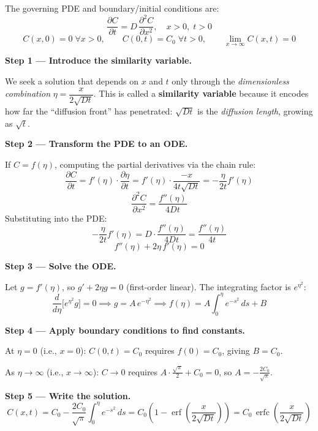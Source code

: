 \documentclass[11pt]{article}
\begin{document}
\begin{methodbox}
The governing PDE and boundary/initial conditions are:
\[
\frac{\partial C}{\partial t} = D\,\frac{\partial^2 C}{\partial x^2}, \quad x > 0, \; t > 0
\]
\[
C(x, 0) = 0 \; \forall x > 0, \qquad C(0, t) = C_0 \; \forall t > 0, \qquad \lim_{x \to \infty} C(x,t) = 0
\]

\textbf{Step 1 --- Introduce the similarity variable.}

We seek a solution that depends on $x$ and $t$ only through the \textit{dimensionless combination} $\eta = \dfrac{x}{2\sqrt{Dt}}$. This is called a \textbf{similarity variable} because it encodes how far the ``diffusion front'' has penetrated: $\sqrt{Dt}$ is the \textit{diffusion length}, growing as $\sqrt{t}$.

\textbf{Step 2 --- Transform the PDE to an ODE.}

If $C = f(\eta)$, computing the partial derivatives via the chain rule:
\[
\frac{\partial C}{\partial t} = f'(\eta)\cdot\frac{\partial\eta}{\partial t} = f'(\eta)\cdot\frac{-x}{4t\sqrt{Dt}} = -\frac{\eta}{2t}f'(\eta)
\]
\[
\frac{\partial^2 C}{\partial x^2} = \frac{f''(\eta)}{4Dt}
\]
Substituting into the PDE:
\[
-\frac{\eta}{2t}f'(\eta) = D\cdot\frac{f''(\eta)}{4Dt} = \frac{f''(\eta)}{4t}
\]
\[
f''(\eta) + 2\eta\,f'(\eta) = 0
\]

\textbf{Step 3 --- Solve the ODE.}

Let $g = f'(\eta)$, so $g' + 2\eta g = 0$ (first-order linear). The integrating factor is $e^{\eta^2}$:
\[
\frac{d}{d\eta}\bigl[e^{\eta^2}g\bigr] = 0 \implies g = A\,e^{-\eta^2} \implies f(\eta) = A\int_0^{\eta} e^{-s^2}\,ds + B
\]

\textbf{Step 4 --- Apply boundary conditions to find constants.}

At $\eta = 0$ (i.e., $x = 0$): $C(0,t) = C_0$ requires $f(0) = C_0$, giving $B = C_0$.

As $\eta \to \infty$ (i.e., $x \to \infty$): $C \to 0$ requires $A\cdot\frac{\sqrt{\pi}}{2} + C_0 = 0$, so $A = -\frac{2C_0}{\sqrt{\pi}}$.

\textbf{Step 5 --- Write the solution.}
\[
C(x,t) = C_0 - \frac{2C_0}{\sqrt{\pi}}\int_0^{\eta}e^{-s^2}\,ds = C_0\!\left(1 - \operatorname{erf}\!\left(\frac{x}{2\sqrt{Dt}}\right)\right) = C_0\,\operatorname{erfc}\!\left(\frac{x}{2\sqrt{Dt}}\right)
\]
\end{methodbox}
\end{document}
